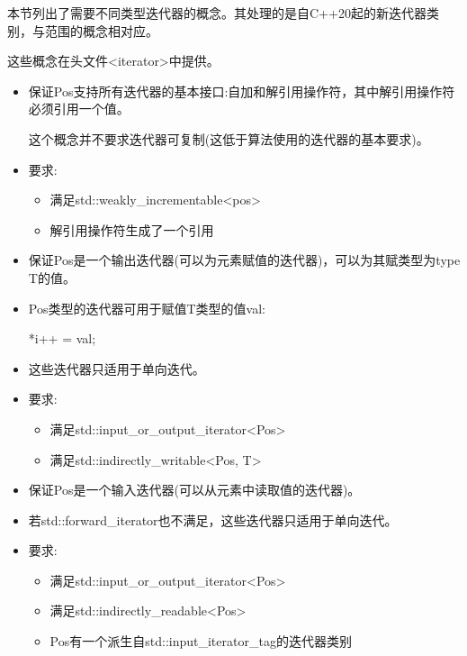 
本节列出了需要不同类型迭代器的概念。其处理的是自C++20起的新迭代器类别，与范围的概念相对应。

这些概念在头文件<iterator>中提供。


\begin{itemize}
\item
保证Pos支持所有迭代器的基本接口:自加和解引用操作符，其中解引用操作符必须引用一个值。

这个概念并不要求迭代器可复制(这低于算法使用的迭代器的基本要求)。

\item
要求:
\begin{itemize}
\item
满足std::weakly\_incrementable<pos>

\item
解引用操作符生成了一个引用
\end{itemize}
\end{itemize}


\begin{itemize}
\item
保证Pos是一个输出迭代器(可以为元素赋值的迭代器)，可以为其赋类型为type T的值。

\item
Pos类型的迭代器可用于赋值T类型的值val:

\begin{cpp}
*i++ = val;
\end{cpp}

\item
这些迭代器只适用于单向迭代。

\item
要求:
\begin{itemize}
\item
满足std::input\_or\_output\_iterator<Pos>

\item
满足std::indirectly\_writable<Pos, T>
\end{itemize}
\end{itemize}


\begin{itemize}
\item
保证Pos是一个输入迭代器(可以从元素中读取值的迭代器)。

\item
若std::forward\_iterator也不满足，这些迭代器只适用于单向迭代。

\item
要求:
\begin{itemize}
\item
满足std::input\_or\_output\_iterator<Pos>

\item
满足std::indirectly\_readable<Pos>

\item
Pos有一个派生自std::input\_iterator\_tag的迭代器类别
\end{itemize}
\end{itemize}

